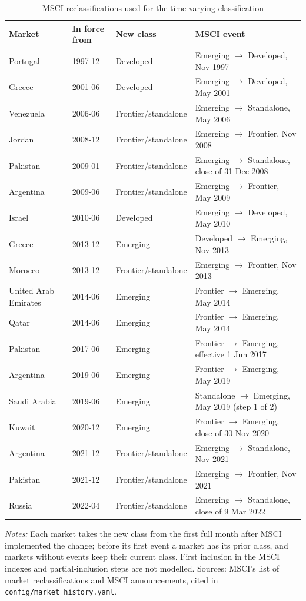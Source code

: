 \begin{table}[!ht]
\centering\footnotesize\setlength{\tabcolsep}{4pt}
\caption{MSCI reclassifications used for the time-varying classification}
\label{tab:classification}
\begin{tabular}{llll}
\toprule
Market & In force from & New class & MSCI event \\
\midrule
Portugal & 1997-12 & Developed & Emerging $\to$ Developed, Nov 1997 \\
Greece & 2001-06 & Developed & Emerging $\to$ Developed, May 2001 \\
Venezuela & 2006-06 & Frontier/standalone & Emerging $\to$ Standalone, May 2006 \\
Jordan & 2008-12 & Frontier/standalone & Emerging $\to$ Frontier, Nov 2008 \\
Pakistan & 2009-01 & Frontier/standalone & Emerging $\to$ Standalone, close of 31 Dec 2008 \\
Argentina & 2009-06 & Frontier/standalone & Emerging $\to$ Frontier, May 2009 \\
Israel & 2010-06 & Developed & Emerging $\to$ Developed, May 2010 \\
Greece & 2013-12 & Emerging & Developed $\to$ Emerging, Nov 2013 \\
Morocco & 2013-12 & Frontier/standalone & Emerging $\to$ Frontier, Nov 2013 \\
United Arab Emirates & 2014-06 & Emerging & Frontier $\to$ Emerging, May 2014 \\
Qatar & 2014-06 & Emerging & Frontier $\to$ Emerging, May 2014 \\
Pakistan & 2017-06 & Emerging & Frontier $\to$ Emerging, effective 1 Jun 2017 \\
Argentina & 2019-06 & Emerging & Frontier $\to$ Emerging, May 2019 \\
Saudi Arabia & 2019-06 & Emerging & Standalone $\to$ Emerging, May 2019 (step 1 of 2) \\
Kuwait & 2020-12 & Emerging & Frontier $\to$ Emerging, close of 30 Nov 2020 \\
Argentina & 2021-12 & Frontier/standalone & Emerging $\to$ Standalone, Nov 2021 \\
Pakistan & 2021-12 & Frontier/standalone & Emerging $\to$ Frontier, Nov 2021 \\
Russia & 2022-04 & Frontier/standalone & Emerging $\to$ Standalone, close of 9 Mar 2022 \\
\bottomrule
\end{tabular}

\vspace{4pt}
\begin{minipage}{0.95\linewidth}\footnotesize
\textit{Notes:} Each market takes the new class from the first full month after MSCI implemented the change; before its first event a market has its prior class, and markets without events keep their current class. First inclusion in the MSCI indexes and partial-inclusion steps are not modelled. Sources: MSCI's list of market reclassifications and MSCI announcements, cited in \texttt{config/market\_history.yaml}.
\end{minipage}
\end{table}
